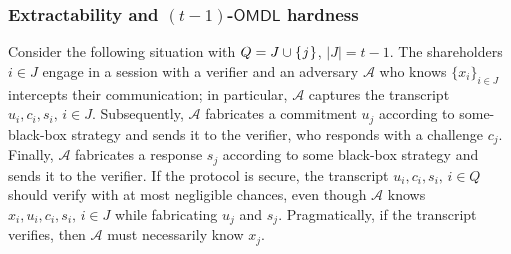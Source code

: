 \documentclass[psamsfonts, reqno]{amsart}
\theoremstyle{definition}
\theoremstyle{remark}
\numberwithin{equation}{section}
\begin{document}
\subsubsection{Extractability and $(t-1)$-$\mathsf{OMDL}$ hardness}\label{section_extractability}
Consider the following situation with
$Q = J \cup \{\hspace{0.5pt}j\hspace{0.5pt}\}$,
$|J| = t-1$.
The shareholders $i \in J$ engage
in a session with a verifier
and an adversary $\mathcal{A}$
who knows $\{x_i\}_{i \in J}$ intercepts
their communication; in particular,
$\mathcal{A}$ captures the transcript
$u_i, c_i, s_i,\hspace{2pt} i \in J$.
Subsequently, $\mathcal{A}$ fabricates a commitment $u_j$
according to some-black-box strategy and sends it to the
verifier, who responds with a challenge $c_j$.
Finally, $\mathcal{A}$ fabricates a response $s_j$
according to some black-box strategy and sends it to the verifier.
If the protocol is secure, the transcript
$u_i, c_i, s_i,\hspace{2pt} i \in Q$
should verify with at most negligible chances,
even though $\mathcal{A}$ knows
$x_i, u_i, c_i, s_i,\hspace{2pt} i \in J$
while fabricating $u_j$ and $s_j$.
Pragmatically, if the transcript verifies,
then $\mathcal{A}$ must necessarily know $x_j$.
\end{document}
